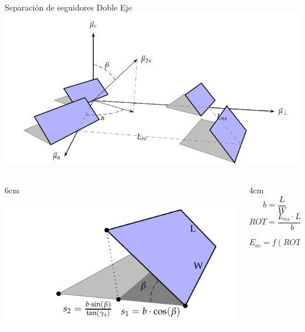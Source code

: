 \documentclass[xcolor={usenames,svgnames,dvipsnames}]{beamer}
\begin{document}
\begin{frame}[label=sec-2-3-1]{Separación de seguidores Doble Eje}
\includegraphics[height=0.5\textheight]{../figs/Sombras2X.pdf}

\begin{columns}
\begin{column}{6cm\textwidth}

\includegraphics[width=.9\linewidth]{../figs/DimensionesSeguidorSombra.pdf}
\end{column}

\begin{column}{4cm\textwidth}
$$b=\frac{L}{W}$$ 
$$ROT=\frac{L_{ns}\cdot L_{eo}}{b}$$

$$E_{ac}=f(ROT)??$$
\end{column}
\end{columns}
\end{frame}
\end{document}
